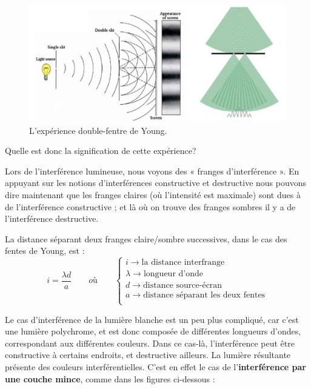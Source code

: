\documentclass[11pt,a4paper]{article}
\begin{document}
\begin{figure}[h]
    \centering
    \includegraphics[width=\linewidth]{imgs/p5/young2.jpg}
    \caption{L'expérience double-fentre de Young.}
\end{figure}

\begin{exo} Quelle est donc la signification de cette expérience?  
\vspace{2cm}
\end{exo}

Lors de l’interférence lumineuse, nous voyons des « franges d’interférence ».  En appuyant sur les notions d’interférences constructive et destructive nous pouvons dire maintenant que les franges claires (où l’intensité est maximale) sont dues à de l’interférence constructive ; et là où on trouve des franges sombres il y a de l’interférence destructive.  

La distance séparant deux franges claire/sombre successives, dans le cas des fentes de Young, est :
\[  i = \dfrac{\lambda d}{a}
\quad \quad  où \quad  \quad 
\begin{cases}
    i \rightarrow \text{la distance interfrange } \\
    \lambda \rightarrow \text{longueur d'onde} \\ 
    d \rightarrow \text{distance source-écran} \\
    a  \rightarrow \text{distance séparant les deux fentes} \\
\end{cases}
\]

Le cas d’interférence de la lumière blanche est un peu plus compliqué, car c’est une lumière polychrome, et est donc composée de différentes longueurs d’ondes, correspondant aux différentes couleurs. Dans ce cas-là, l’interférence peut être constructive à certains endroits, et destructive ailleurs. La lumière résultante présente des couleurs interférentielles. C’est en effet le cas de l’\textbf{interférence par une couche mince}, comme dans les figures ci-dessous :
\end{document}
